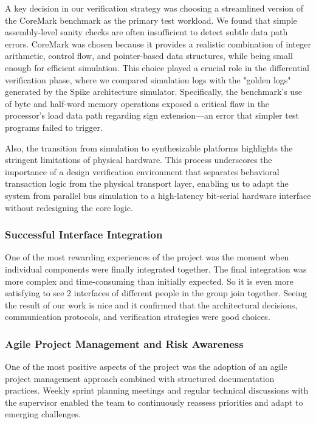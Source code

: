 \documentclass[10pt]{article}
\begin{document}
A key decision in our verification strategy was choosing a streamlined version of the CoreMark benchmark as the primary test workload. We found that simple assembly-level sanity checks are often insufficient to detect subtle data path errors. CoreMark was chosen because it provides a realistic combination of integer arithmetic, control flow, and pointer-based data structures, while being small enough for efficient simulation. This choice played a crucial role in the differential verification phase, where we compared simulation logs with the "golden logs" generated by the Spike architecture simulator. Specifically, the benchmark's use of byte and half-word memory operations exposed a critical flaw in the processor's load data path regarding sign extension—an error that simpler test programs failed to trigger.

Also, the transition from simulation to synthesizable platforms highlights the stringent limitations of physical hardware. This process underscores the importance of a design verification environment that separates behavioral transaction logic from the physical transport layer, enabling us to adapt the system from parallel bus simulation to a high-latency bit-serial hardware interface without redesigning the core logic.


\subsubsection{Successful Interface Integration}
One of the most rewarding experiences of the project was the moment when individual components were finally integrated together. The final integration was more complex and time-consuming than initially expected. So it is even more satisfying to see 2 interfaces of different people in the group join together. Seeing the result of our work is nice and it confirmed that the architectural decisions, communication protocols, and verification strategies were good choices. 

\subsubsection{Agile Project Management and Risk Awareness}
One of the most positive aspects of the project was the adoption of an agile project management approach combined with structured documentation practices. Weekly sprint planning meetings and regular technical discussions with the supervisor enabled the team to continuously reassess priorities and adapt to emerging challenges. 
\end{document}
